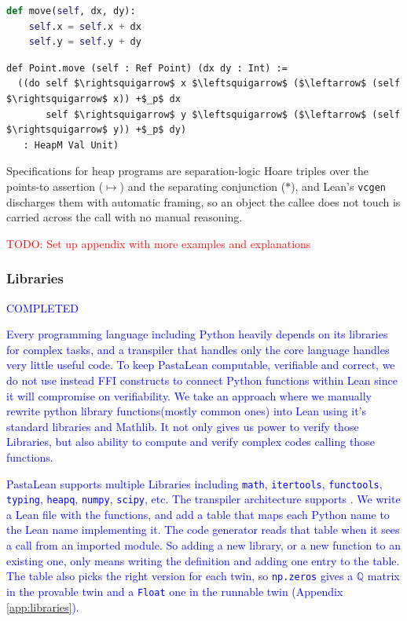 \documentclass{article}
\newcommand{\code}{\lstinline}
\newcommand{\todo}[1]{\textcolor{red}{TODO: #1}}
\newcommand{\suggest}[1]{\textcolor{blue}{#1}}
\newcommand{\leftsquigarrow}{\reflectbox{$\rightsquigarrow$}}
\begin{document}
\noindent
\begin{minipage}[t]{0.42\textwidth}
\begin{lstlisting}[language=python,caption={Python source.},label={lst:heap-py},breaklines=true]
def move(self, dx, dy):
    self.x = self.x + dx
    self.y = self.y + dy
\end{lstlisting}
\end{minipage}%
\hfill
\begin{minipage}[t]{0.54\textwidth}
\begin{lstlisting}[language=lean,caption={Generated \code{--heap} translation.},label={lst:heap-lean},breaklines=true,mathescape=true]
def Point.move (self : Ref Point) (dx dy : Int) :=
  ((do self $\rightsquigarrow$ x $\leftsquigarrow$ ($\leftarrow$ (self $\rightsquigarrow$ x)) +$_p$ dx
       self $\rightsquigarrow$ y $\leftsquigarrow$ ($\leftarrow$ (self $\rightsquigarrow$ y)) +$_p$ dy)
   : HeapM Val Unit)
\end{lstlisting}
\end{minipage}

Specifications for heap programs are separation-logic Hoare triples over the points-to assertion
($\mapsto$) and the separating conjunction ($\ast$), and Lean's \code{vcgen} discharges them
with automatic framing, so an object the callee does not touch is carried across the call with no manual reasoning.

\todo{Set up appendix with more examples and explanations}

\subsubsection{Libraries}
\suggest{COMPLETED}


\suggest{Every programming language including Python heavily depends on its libraries for complex tasks, and a transpiler that handles only the core language handles very little useful code. To keep PastaLean computable, verifiable and correct, we do not use instead FFI constructs to connect Python functions within Lean since it will compromise on verifiability. We take an approach where we manually rewrite python library functions(mostly common ones) into Lean using it's standard libraries and Mathlib. It not only gives us power to verify those Libraries, but also ability to compute and verify complex codes calling those functions.}

\suggest{PastaLean supports multiple Libraries including \code{math}, \code{itertools}, \code{functools}, \code{typing}, \code{heapq}, \code{numpy}, \code{scipy}, etc. The transpiler architecture supports . We write a Lean file with the functions, and add a table that maps each Python name to the Lean name implementing it. The code generator reads that table when it sees a call from an imported module. So adding a new library, or a new function to an existing one, only means writing the definition and adding one entry to the table. The table also picks the right version for each twin, so \code{np.zeros} gives a $\mathbb{Q}$ matrix in the provable twin and a \code{Float} one in the runnable twin (Appendix \ref{app:libraries}).}
\end{document}
